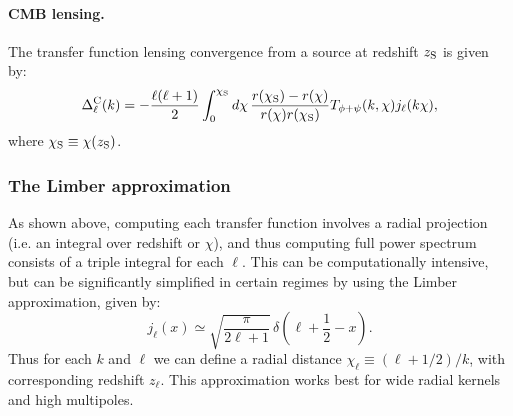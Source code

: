 \documentclass[\docopts]{\docclass}
\begin{document}
\paragraph{\bf CMB lensing.} The transfer function lensing convergence from a source at redshift $z_{\rm S}$ is given by:
\begin{equation} \label{eq:transfer_cmb_lensing}
  \Delta_\ell^{\rm C}(k)=-\frac{\ell(\ell+1)}{2}\int_0^{\chi_{\rm S}} d\chi\,\frac{r(\chi_{\rm S})-r(\chi)}{r(\chi)r(\chi_{\rm S})}T_{\phi+\psi}(k,\chi) j_\ell(k\chi),
\end{equation}
where $\chi_{\rm S}\equiv\chi(z_{\rm S})$.

\subsubsection{The Limber approximation}
As shown above, computing each transfer function involves a radial projection (i.e. an integral over redshift or $\chi$), and thus computing full power spectrum consists of a triple integral for each $\ell$. This can be computationally intensive, but can be significantly simplified in certain regimes by using the Limber approximation, given by:
\begin{equation}
 j_\ell(x)\simeq\sqrt{\frac{\pi}{2\ell+1}}\,\delta\left(\ell+\frac{1}{2}-x\right).
\end{equation}
Thus for each $k$ and $\ell$ we can define a radial distance $\chi_\ell\equiv(\ell+1/2)/k$, with corresponding redshift $z_\ell$. This approximation works best for wide radial kernels and high multipoles.
\end{document}
